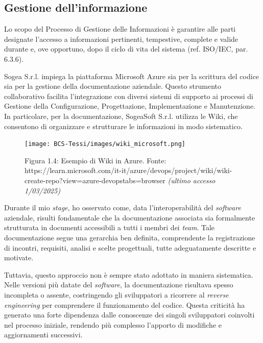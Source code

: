         \subsection{Gestione dell’informazione}

        Lo scopo del Processo di Gestione delle Informazioni è garantire alle parti designate l’accesso a informazioni pertinenti, tempestive, complete e valide durante e, ove opportuno, dopo il ciclo di vita del sistema (ref. ISO/IEC, par. 6.3.6).  

        \noindent Sogea S.r.l. impiega la piattaforma Microsoft Azure sia per la scrittura del codice sia per la gestione della documentazione aziendale. Questo strumento collaborativo facilita l'integrazione con diversi sistemi di supporto ai processi di Gestione della Configurazione, Progettazione, Implementazione e Manutenzione. In particolare, per la documentazione, SogeaSoft S.r.l. utilizza le Wiki, che consentono di organizzare e strutturare le informazioni in modo sistematico.  

        \begin{figure}[H]
            \centering
            \texttt{[image: BCS-Tessi/images/wiki\_microsoft.png]}
            \caption{Figura 1.4: Esempio di Wiki in Azure. Fonte: https://learn.microsoft.com/it-it/azure/devops/project/wiki/wiki-create-repo?view=azure-devopstabs=browser \textit{(ultimo accesso 1/03/2025)}}
            \label{fig:Wiki}
        \end{figure}

        \noindent Durante il mio \textit{stage}, ho osservato come, data l’interoperabilità del \textit{software} aziendale, risulti fondamentale che la documentazione associata sia formalmente strutturata in documenti accessibili a tutti i membri dei \textit{team}. Tale documentazione segue una gerarchia ben definita, comprendente la registrazione di incontri, requisiti, analisi e scelte progettuali, tutte adeguatamente descritte e motivate.  

        \noindent Tuttavia, questo approccio non è sempre stato adottato in maniera sistematica. Nelle versioni più datate del \textit{software}, la documentazione risultava spesso incompleta o assente, costringendo gli sviluppatori a ricorrere al \textit{reverse engineering} per comprendere il funzionamento del codice. Questa criticità ha generato una forte dipendenza dalle conoscenze dei singoli sviluppatori coinvolti nel processo iniziale, rendendo più complesso l’apporto di modifiche e aggiornamenti successivi.  


